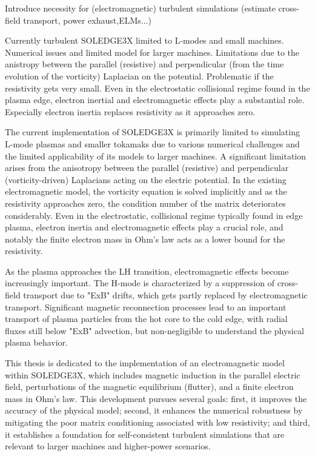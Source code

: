 Introduce necessity for (electromagnetic) turbulent simulations (estimate cross-field transport, power exhaust,ELMs...)  

Currently turbulent SOLEDGE3X limited to L-modes and small machines. Numerical issues and limited model for larger machines. Limitations due to the anistropy between the parallel (resistive) and perpendicular (from the time evolution of the vorticity) Laplacian on the potential. Problematic if the resistivity gets very small. Even in the electrostatic collisional regime found in the plasma edge, electron inertial and electromagnetic effects play a substantial role. Especially electron inertia replaces resistivity as it approaches zero. 


The current implementation of SOLEDGE3X is primarily limited to simulating L-mode plasmas and smaller tokamaks due to various numerical challenges and the limited applicability of its models to larger machines. A significant limitation arises from the anisotropy between the parallel (resistive) and perpendicular (vorticity-driven) Laplacians acting on the electric potential. In the existing electromagnetic model, the vorticity equation is solved implicitly and as the resistivity approaches zero, the condition number of the matrix deteriorates considerably. Even in the electrostatic, collisional regime typically found in edge plasma, electron inertia and electromagnetic effects play a crucial role, and notably the finite electron mass in Ohm's law acts as a lower bound for the resistivity.

As the plasma approaches the LH transition, electromagnetic effects become increasingly important. The H-mode is characterized by a suppression of cross-field transport due to "ExB" drifts, which gets partly replaced by electromagnetic transport. Significant magnetic reconnection processes lead to an important transport of plasma particles from the hot core to the cold edge, with radial fluxes still below "ExB" advection, but non-negligible to understand the physical plasma behavior.

This thesis is dedicated to the implementation of an electromagnetic model within SOLEDGE3X, which includes magnetic induction in the parallel electric field, perturbations of the magnetic equilibrium (flutter), and a finite electron mass in Ohm's law. This development pursues several goals: first, it improves the accuracy of the physical model; second, it enhances the numerical robustness by mitigating the poor matrix conditioning associated with low resistivity; and third, it establishes a foundation for self-consistent turbulent simulations that are relevant to larger machines and higher-power scenarios.